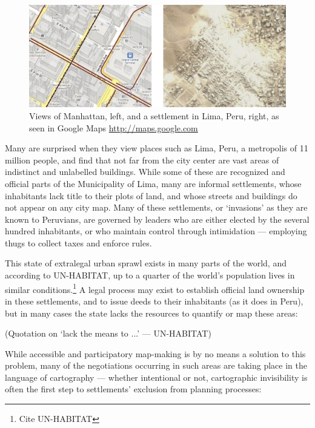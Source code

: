 \documentclass[11pt,oneside,notitlepage]{report}
\begin{document}
\begin{figure}[h]
	\begin{center}
		\includegraphics[width=1\textwidth]{images/two-worlds-mapping.png}
		\caption{Views of Manhattan, left, and a settlement in Lima, Peru, right, as seen in Google Maps \url{http://maps.google.com}}
	\end{center}
\end{figure}

Many are surprised when they view places such as Lima, Peru, a metropolis of 11 million people, and find that not far from the city center are vast areas of indistinct and unlabelled buildings. While some of these are recognized and official parts of the Municipality of Lima, many are informal settlements, whose inhabitants lack title to their plots of land, and whose streets and buildings do not appear on any city map. Many of these settlements, or `invasions' as they are known to Peruvians, are governed by leaders who are either elected by the several hundred inhabitants, or who maintain control through intimidation --- employing thugs to collect taxes and enforce rules. 

This state of extralegal urban sprawl exists in many parts of the world, and according to UN-HABITAT, up to a quarter of the world's population lives in similar conditions.\footnote{Cite UN-HABITAT} A legal process may exist to establish official land ownership in these settlements, and to issue deeds to their inhabitants (as it does in Peru), but in many cases the state lacks the resources to quantify or map these areas:

(Quotation on `lack the means to ...' --- UN-HABITAT)

While accessible and participatory map-making is by no means a solution to this problem, many of the negotiations occurring in such areas are taking place in the language of cartography --- whether intentional or not, cartographic invisibility is often the first step to settlements' exclusion from planning processes: 
\end{document}
